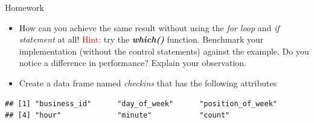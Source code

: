 \begin{DIY}{Homework}
 \begin{itemize}
  \item \noindent How can you achieve the same result without using the \emph{for loop} and \emph{if statement} at all! \textcolor{red}{Hint:} try the \textbf{\emph{which()}} function. Benchmark your implementation (without the control statements) against the example. Do you notice a difference in performance? Explain your observation.
  \item \noindent Create a data frame named \emph{checkins} that has the following attributes
\end{itemize}
\end{DIY}

\begin{knitrout}
\color{fgcolor}\begin{kframe}
\begin{alltt}
\end{alltt}
\begin{verbatim}
## [1] "business_id"      "day_of_week"      "position_of_week"
## [4] "hour"             "minute"           "count"
\end{verbatim}
\end{kframe}
\end{knitrout}

